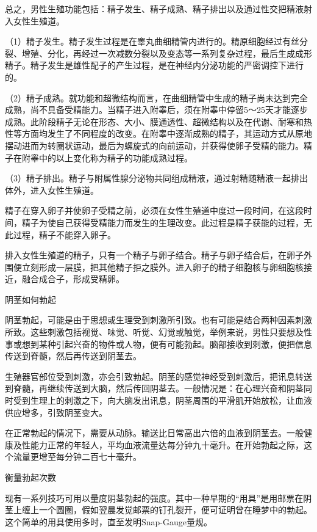 \documentclass[12pt,UTF8]{ctexbook}
\begin{document}
总之，男性生殖功能包括：精子发生、精子成熟、精子排出以及通过性交把精液射入女性生殖道。

（1）精子发生。精子发生过程是在睾丸曲细精管内进行的。精原细胞经过有丝分裂、增殖、分化，再经过一次减数分裂以及变态等一系列复杂过程，最后生成成形精子。精子发生是雄性配子的产生过程，是在神经内分泌功能的严密调控下进行的。

（2）精子成熟。就功能和超微结构而言，在曲细精管中生成的精子尚未达到完全成熟，尚不具备受精能力。当精子进入附睾后，须在附睾中停留5～25天才能逐步成熟。此阶段精子无论在形态、大小、膜通透性、超微结构以及在代谢、耐寒和热性等方面均发生了不同程度的改变。在附睾中逐渐成熟的精子，其运动方式从原地摆动进而为转圈状运动，最后为螺旋式的向前运动，并获得使卵子受精的能力。精子在附睾中的以上变化称为精子的功能成熟过程。

（3）精子排出。精子与附属性腺分泌物共同组成精液，通过射精随精液一起排出体外，进入女性生殖道。

精子在穿入卵子并使卵子受精之前，必须在女性生殖道中度过一段时间，在这段时间，精子为使自己获得受精能力而发生的生理改变。此过程是精子获能的过程，无此过程，精子不能穿入卵子。

排入女性生殖道的精子，只有一个精子与卵子结合。精子与卵子结合后，在卵子外围便立刻形成一层膜，把其他精子拒之膜外。进入卵子的精子细胞核与卵细胞核接近，融合成合子，形成受精卵。





阴茎如何勃起


阴茎勃起，可能是由于思想或生理受到刺激所引致。也有可能是结合两种因素刺激所致。这些刺激包括视觉、味觉、听觉、幻觉或触觉，举例来说，男性只要想及性事或想到某种引起兴奋的物件或人物，便有可能勃起。脑部接收到刺激，便把信息传送到脊髓，然后再传送到阴茎去。

生殖器官部位受到刺激，亦会引致勃起。阴茎的感觉神经受到刺激后，把讯息转送到脊髓，再继续传送到大脑，然后传回阴茎去。一般情况是：在心理兴奋和阴茎同时受到生理上的刺激之下，向大脑发出讯息，阴茎周围的平滑肌开始放松，让血液供应增多，引致阴茎变大。

在正常勃起的情况下，需要从动脉。输送比日常高出六倍的血液到阴茎去。一般健康及性能力正常的年轻人，平均血液流量达每分钟九十毫升。在开始勃起之际，这个流量更增至每分钟二百七十毫升。





衡量勃起次数


现有一系列技巧可用以量度阴茎勃起的强度。其中一种早期的“用具”是用邮票在阴茎上缠上一个圆圈，假如翌晨发觉邮票的钉孔裂开，便可证明曾在睡梦中的勃起。这个简单的用具使用多时，直至发明Snap-Gauge量规。
\end{document}
